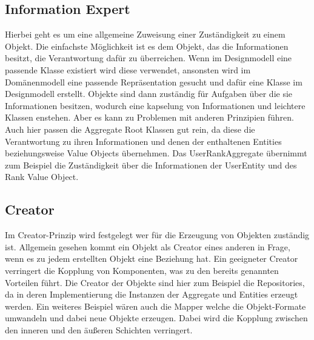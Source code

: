 \subsection{Information Expert}
Hierbei geht es um eine allgemeine Zuweisung einer Zuständigkeit zu einem Objekt.
Die einfachste Möglichkeit ist es dem Objekt, das die Informationen besitzt, die Verantwortung dafür zu überreichen.
Wenn im Designmodell eine passende Klasse existiert wird diese verwendet, ansonsten wird im Domänenmodell eine passende Repräsentation gesucht und dafür eine Klasse im Designmodell erstellt.
Objekte sind dann zuständig für Aufgaben über die sie Informationen besitzen, wodurch eine kapselung von Informationen und leichtere Klassen enstehen.
Aber es kann zu Problemen mit anderen Prinzipien führen.
Auch hier passen die Aggregate Root Klassen gut rein, da diese die Verantwortung zu ihren Informationen und denen der enthaltenen Entities beziehungsweise Value Objects übernehmen.
Das UserRankAggregate übernimmt zum Beispiel die Zuständigkeit über die Informationen der UserEntity und des Rank Value Object.
\subsection{Creator}
Im Creator-Prinzip wird festgelegt wer für die Erzeugung von Objekten zuständig ist.
Allgemein gesehen kommt ein Objekt als Creator eines anderen in Frage, wenn es zu jedem erstellten Objekt eine Beziehung hat.
Ein geeigneter Creator verringert die Kopplung von Komponenten, was zu den bereits genannten Vorteilen führt.
Die Creator der Objekte sind hier zum Beispiel die Repositories, da in deren Implementierung die Instanzen der Aggregate und Entities erzeugt werden.
Ein weiteres Beispiel wären auch die Mapper welche die Objekt-Formate umwandeln und dabei neue Objekte erzeugen.
Dabei wird die Kopplung zwischen den inneren und den äußeren Schichten verringert.


